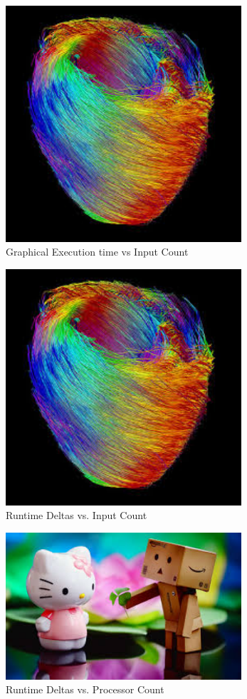 \documentclass[report]{IEEEtran}
\begin{document}
\begin{figure}[h]
\centering
	\includegraphics[width = 8.75cm]{image1}
	\caption{Graphical Execution time vs Input Count}
		
\end{figure}

\begin{figure}[h]
\centering
	\includegraphics[width = 8.75cm]{image1}
	\caption{Runtime Deltas vs. Input Count}
		
\end{figure}

\begin{figure}[h]
\centering
	\includegraphics[width = 8.75cm]{image2}
	\caption{Runtime Deltas vs. Processor Count}
		
\end{figure}
\end{document}
